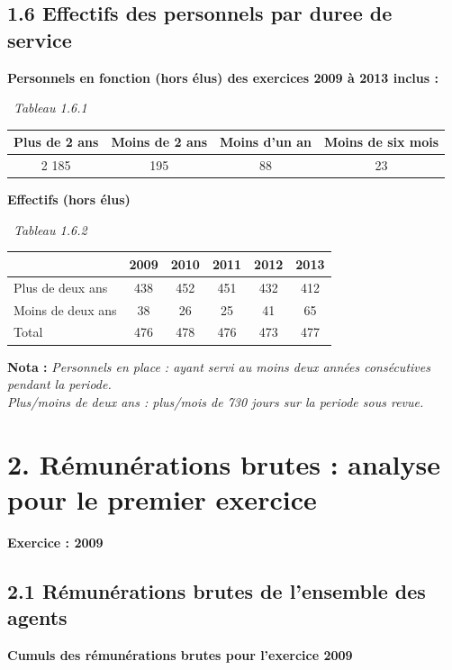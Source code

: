\hypertarget{effectifs-des-personnels-par-duree-de-service}{%
\subsection{1.6 Effectifs des personnels par duree de
service}\label{effectifs-des-personnels-par-duree-de-service}}

\textbf{Personnels en fonction (hors élus) des exercices 2009 à 2013
inclus :}

~\emph{Tableau 1.6.1}

\begin{longtable}[]{@{}cccc@{}}
\toprule
Plus de 2 ans & Moins de 2 ans & Moins d'un an & Moins de six
mois\tabularnewline
\midrule
\endhead
2 185 & 195 & 88 & 23\tabularnewline
\bottomrule
\end{longtable}

\textbf{Effectifs (hors élus)}

~\emph{Tableau 1.6.2}

\begin{longtable}[]{@{}lccccc@{}}
\toprule
& 2009 & 2010 & 2011 & 2012 & 2013\tabularnewline
\midrule
\endhead
Plus de deux ans & 438 & 452 & 451 & 432 & 412\tabularnewline
Moins de deux ans & 38 & 26 & 25 & 41 & 65\tabularnewline
Total & 476 & 478 & 476 & 473 & 477\tabularnewline
\bottomrule
\end{longtable}

\textbf{Nota :} \emph{Personnels en place : ayant servi au moins deux
années consécutives pendant la periode.}\\
\emph{Plus/moins de deux ans : plus/mois de 730 jours sur la periode
sous revue.}

\hypertarget{remunerations-brutes-analyse-pour-le-premier-exercice}{%
\section{2. Rémunérations brutes : analyse pour le premier
exercice}\label{remunerations-brutes-analyse-pour-le-premier-exercice}}

\textbf{Exercice : 2009 }

\hypertarget{remunerations-brutes-de-lensemble-des-agents}{%
\subsection{2.1 Rémunérations brutes de l'ensemble des
agents}\label{remunerations-brutes-de-lensemble-des-agents}}

\textbf{Cumuls des rémunérations brutes pour l'exercice 2009 }

